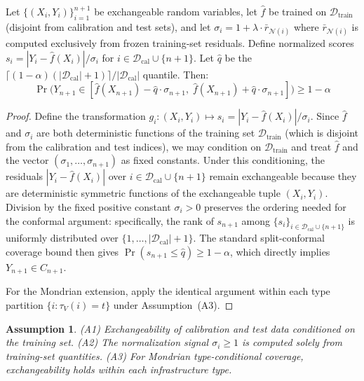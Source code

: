 \documentclass[twoside,11pt]{article}
\newtheorem{assumption}{Assumption}
\begin{document}
\begin{theorem}
\label{thm:chmp}
Let $\{(X_i, Y_i)\}_{i=1}^{n+1}$ be exchangeable random variables, let
$\hat{f}$ be trained on $\mathcal{D}_{\text{train}}$ (disjoint from
calibration and test sets), and let $\sigma_i = 1 + \lambda \cdot
\bar{r}_{\mathcal{N}(i)}$ where $\bar{r}_{\mathcal{N}(i)}$ is computed
exclusively from frozen training-set residuals. Define normalized scores
$s_i = |Y_i - \hat{f}(X_i)| / \sigma_i$ for
$i \in \mathcal{D}_{\text{cal}} \cup \{n+1\}$. Let $\hat{q}$ be the
$\lceil(1-\alpha)(|\mathcal{D}_{\text{cal}}|+1)\rceil /
|\mathcal{D}_{\text{cal}}|$ quantile. Then:
\begin{equation}
\Pr\!\bigr(Y_{n+1} \in [\hat{f}(X_{n+1}) - \hat{q} \cdot \sigma_{n+1},
\; \hat{f}(X_{n+1}) + \hat{q} \cdot \sigma_{n+1}]\bigr) \geq 1 - \alpha
\end{equation}
\end{theorem}

\begin{proof}
Define the transformation $g_i: (X_i, Y_i) \mapsto s_i = |Y_i -
\hat{f}(X_i)|/\sigma_i$.  Since $\hat{f}$ and $\sigma_i$ are both
deterministic functions of the training set $\mathcal{D}_{\text{train}}$
(which is disjoint from the calibration and test indices), we may condition
on $\mathcal{D}_{\text{train}}$ and treat $\hat{f}$ and the vector
$(\sigma_1,\ldots,\sigma_{n+1})$ as fixed constants.  Under this conditioning,
the residuals $|Y_i - \hat{f}(X_i)|$ over $i \in \mathcal{D}_{\text{cal}}
\cup \{n{+}1\}$ remain exchangeable because they are deterministic symmetric
functions of the exchangeable tuple $(X_i, Y_i)$.  Division by the fixed
positive constant $\sigma_i > 0$ preserves the ordering needed for the
conformal argument: specifically, the rank of $s_{n+1}$ among
$\{s_i\}_{i \in \mathcal{D}_{\text{cal}} \cup \{n{+}1\}}$ is uniformly
distributed over $\{1, \ldots, |\mathcal{D}_{\text{cal}}| + 1\}$.  The
standard split-conformal coverage bound \citep{vovk2005algorithmic,
lei2018distribution} then gives
$\Pr(s_{n+1} \leq \hat{q}) \geq 1 - \alpha$,
which directly implies $Y_{n+1} \in C_{n+1}$.

For the Mondrian extension, apply the identical argument within each type
partition $\{i : \tau_V(i) = t\}$ under Assumption~(A3).
\end{proof}

\begin{assumption}
(A1) Exchangeability of calibration and test data conditioned on the training
set. (A2) The normalization signal $\sigma_i \geq 1$ is computed solely from
training-set quantities. (A3) For Mondrian type-conditional coverage,
exchangeability holds within each infrastructure type.
\end{assumption}
\end{document}
